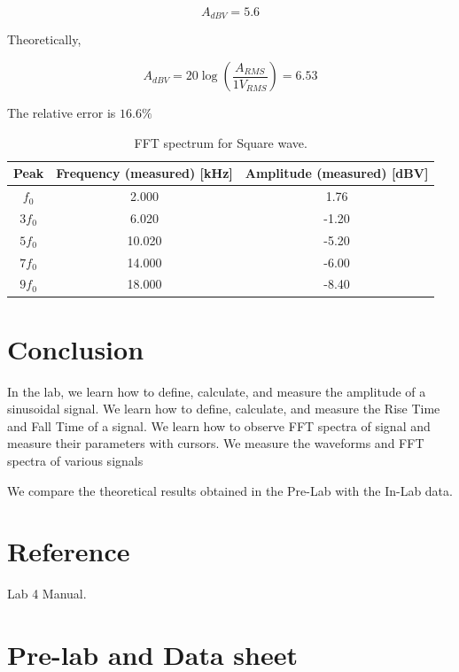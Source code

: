 \documentclass{article}
\begin{document}
$$A_{dBV}=5.6$$

Theoretically,

$$A_{dBV}=20\log\left(\frac{A_{RMS}}{1V_{RMS}}\right)=6.53$$

The relative error is $16.6\%$\\


\begin{table}[!h]
\begin{center}
\begin{tabular}{|c|c|c|}
\hline
Peak & Frequency (measured) [kHz] & Amplitude (measured) [dBV] \\
\hline
$f_0$  &	2.000	&	1.76	\\
\hline
$3f_0$ &	6.020	&	-1.20	\\
\hline
$5f_0$ &	10.020	&	-5.20	\\
\hline
$7f_0$ &	14.000	&	-6.00	\\
\hline
$9f_0$ &	18.000	&	-8.40	\\
\hline
\end{tabular}
\caption{FFT spectrum for Square wave.}
\label{tab-5}
\end{center}
\end{table}


\section{Conclusion}
In the lab, we learn how to define, calculate, and measure the amplitude of a sinusoidal
signal. We
learn how to define, calculate, and measure the Rise Time and Fall Time of a
signal. We
learn how to observe FFT spectra of signal and measure their parameters with
cursors.
We
measure the waveforms and FFT spectra of various signals

We compare the theoretical results obtained in the Pre-Lab with the In-Lab
data.

\section{Reference}
Lab 4 Manual.

\section{Pre-lab and Data sheet}
\end{document}
